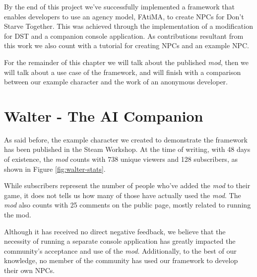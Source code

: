 \cleardoublepage
\label{chapter:evaluation}

\noindent By the end of this project we've successfully implemented a framework that enables developers to use an agency model, \ac{FAtiMA}, to create \acp{NPC} for Don't Starve Together.
This was achieved through the implementation of a modification for \ac{DST} and a companion console application.
As contributions resultant from this work we also count with a tutorial for creating \acp{NPC} and an example \ac{NPC}.

For the remainder of this chapter we will talk about the published \textit{mod}, then we will talk about a use case of the framework, and will finish with a comparison between our example character and the work of an anonymous developer.

\section{Walter - The AI Companion}

\noindent As said before, the example character we created to demonstrate the framework has been published in the Steam Workshop.
At the time of writing, with 48 days of existence, the \textit{mod} counts with 738 unique viewers and 128 subscribers, as shown in Figure \ref{fig:walter-stats}.

While subscribers represent the number of people who've added the \textit{mod} to their game, it does not tells us how many of those have actually used the \textit{mod}.
The \textit{mod} also counts with 25 comments on the public page, mostly related to running the mod.

Although it has received no direct negative feedback, we believe that the necessity of running a separate console application has greatly impacted the community's acceptance and use of the \textit{mod}.
Additionally, to the best of our knowledge, no member of the community has used our framework to develop their own \acp{NPC}.

